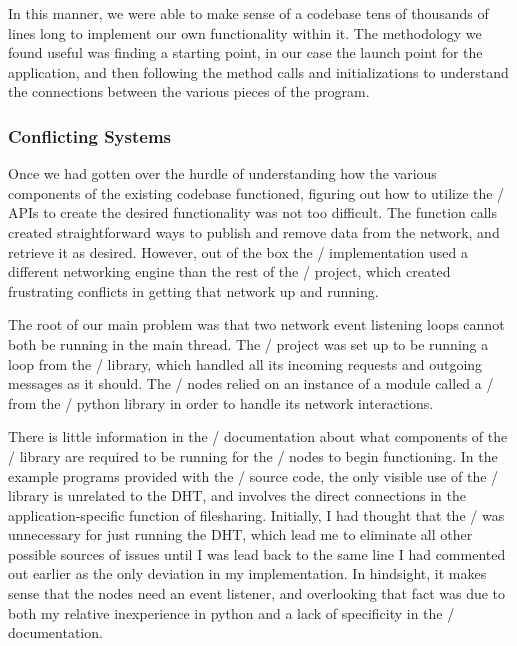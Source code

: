 \documentclass[11pt,twocolumn]{article}
\begin{document}
In this manner, we were able to make sense of a codebase tens of thousands of lines long to implement our own functionality within it.
The methodology we found useful was finding a starting point, in our case the launch point for the application, and then following the method calls and initializations to understand the connections between the various pieces of the program.

\subsubsection{Conflicting Systems}
Once we had gotten over the hurdle of understanding how the various components of the existing codebase functioned, figuring out how to utilize the \Entangled/ APIs to create the desired functionality was not too difficult.
The function calls created straightforward ways to publish and remove data from the network, and retrieve it as desired.
However, out of the box the \Entangled/ implementation used a different networking engine than the rest of the \OpenBazaar/ project, which created frustrating conflicts in getting that network up and running.

The root of our main problem was that two network event listening loops cannot both be running in the main thread.
The \OpenBazaar/ project was set up to be running a loop from the \Tornado/ library, which handled all its incoming requests and outgoing messages as it should.
The \Entangled/ nodes relied on an instance of a module called a \reactor/ from the \Twisted/ python library in order to handle its network interactions.

There is little information in the \Entangled/ documentation about what components of the \Twisted/ library are required to be running for the \Entangled/ nodes to begin functioning.
In the example programs provided with the \Entangled/ source code, the only visible use of the \Twisted/ library is unrelated to the DHT, and involves the direct connections in the application-specific function of filesharing.
Initially, I had thought that the \reactor/ was unnecessary for just running the DHT, which lead me to eliminate all other possible sources of issues until I was lead back to the same line I had commented out earlier as the only deviation in my implementation.
In hindsight, it makes sense that the nodes need an event listener, and overlooking that fact was due to both my relative inexperience in python and a lack of specificity in the \Entangled/ documentation.
\end{document}
